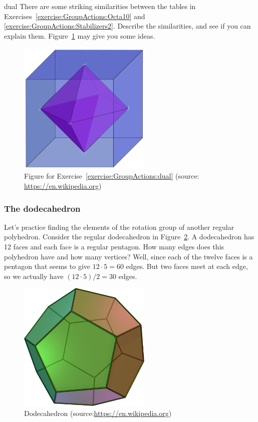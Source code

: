 \begin{exercise}{dual}
There are some striking similarities between the tables in Exercises~\ref{exercise:GroupActions:Octa10} and \ref{exercise:GroupActions:Stabilizers2}. Describe the similarities, and see if you can explain them. Figure~\ref{fig:Dual} may give you some ideas.
\end{exercise}

\begin{figure}[ht]
\begin{center}
\includegraphics[width=2.5in]{images/Dual_Cube-Octahedron.png}
\caption{\label{fig:Dual}Figure for Exercise~\ref{exercise:GroupActions:dual} (source: \url{https://en.wikipedia.org})}

\end{center}
\end{figure}

\subsubsection*{The dodecahedron}
Let's practice finding the elements of the rotation group of another regular polyhedron.  Consider the regular dodecahedron in Figure~\ref{fig:Dodeca}.  A dodecahedron has 12 faces and each face is a regular pentagon.  How many edges does this polyhedron have and how many vertices?  Well, since each of the twelve faces is a pentagon that seems to give $12\cdot 5=60$ edges.  But two faces meet at each edge, so we actually have $(12\cdot 5)/2=30$ edges.

\begin{figure}[ht]
\begin{center}
\includegraphics[width=2.5in]{images/Dodecahedron.png}
\caption{\label{fig:Dodeca}Dodecahedron (source:\url{https://en.wikipedia.org})}

\end{center}
\end{figure}

